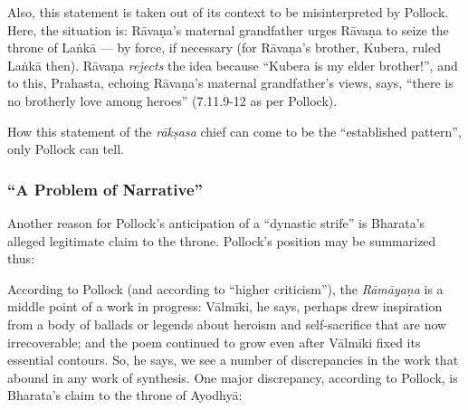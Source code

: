 Also, this statement is taken out of its context to be misinterpreted by Pollock. Here, the situation is: Rāvaṇa’s maternal grandfather urges Rāvaṇa to seize the throne of Laṅkā --- by force, if necessary (for Rāvaṇa’s brother, Kubera, ruled Laṅkā then). Rāvaṇa {\sl rejects} the idea because “Kubera is my elder brother!”, and to this, Prahasta, echoing Rāvaṇa’s maternal grandfather’s views, says, “there is no brotherly love among heroes” (7.11.9-12 as per Pollock).

How this statement of the {\sl rākṣasa} chief can come to be the “established pattern”, only Pollock can tell.\\[-21pt] 

\subsubsection{“A Problem of Narrative”}\label{sec1.2.3.2}

Another reason for Pollock’s anticipation of a “dynastic strife” is Bharata’s alleged legitimate claim to the throne. Pollock’s position may be summarized thus: 

According to Pollock (and according to “higher criticism”), the {\sl Rāmāyaṇa} is a middle point of a work in progress: Vālmīki, he says, perhaps drew inspiration from a body of ballads or legends about heroism and self-sacrifice that are now irrecoverable; and the poem continued to grow even after Vālmīki fixed its essential contours. So, he says, we see a number of discrepancies in the work that abound in any work of synthesis. One major discrepancy, according to Pollock, is Bharata’s claim to the throne of Ayodhyā: 

